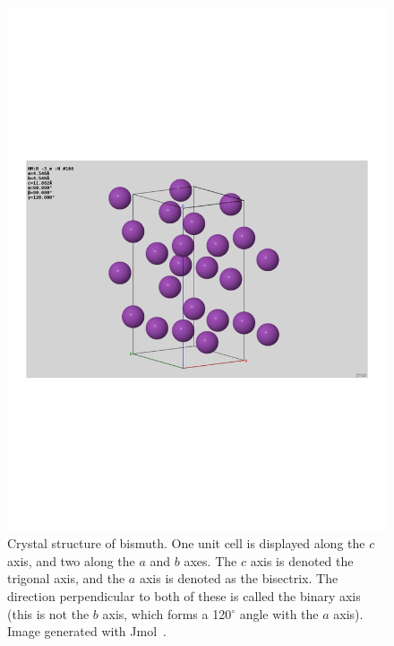 \documentclass{thesis-umich}
\begin{document}
\begin{figure}
	\centering
	\caption[Crystal Strucure of Bismuth]{Crystal structure of bismuth. One unit cell is displayed along the $c$ axis, and two along the $a$ and $b$ axes. The $c$ axis is denoted the trigonal axis, and the $a$ axis is denoted as the bisectrix. The direction perpendicular to both of these is called the binary axis (this is not the $b$ axis, which forms a 120$^\circ$ angle with the $a$ axis). Image generated with Jmol~\cite{jmol}.}
	\label{fig:bismuth_crystal}
	\includegraphics[trim={2in 3in 2in 3in},clip]{figures/bismuth_crystal.pdf}
\end{figure}
\end{document}
